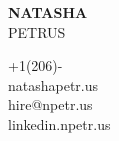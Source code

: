 \documentclass[letterpage]{article}
\begin{document}
\thispagestyle{empty} %
\begin{minipage}[]{0.4\linewidth}
\raggedright
\textbf{\fontsize{37px}{1px}\selectfont\textsf{NATASHA}}\\
\vspace{7px}
{\fontsize{37px}{1px}\selectfont\textsf{PETRUS}}
\end{minipage}
\begin{minipage}{0.01\linewidth}
\end{minipage}
\:\:\:\:\:\:\:\:\:\:\:\:\:\:\:\:\:\: %
\begin{minipage}{0.55\linewidth}
\raggedleft
\vspace{5px} %
+1\thinspace(206)\thinspace-
\enspace\faPhone\\
natashapetr.us\enspace\faGlobe\\
hire@npetr.us\enspace\faEnvelope\\
linkedin.npetr.us\enspace\faLinkedin
\end{minipage}
\vspace{11px}\\
\end{document}
